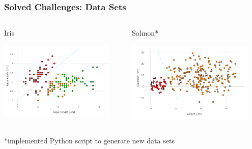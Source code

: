 \documentclass[english,hangout]{beamer}
\begin{document}
\begin{frame}
	\frametitle{Solved Challenges: Data Sets}

  \begin{columns}
    \begin{column}{0.5\textwidth}
      \begin{center}
        Iris

        \includegraphics[width=0.9\textwidth]{Iris}
      \end{center}
    \end{column}
    \begin{column}{0.5\textwidth}
      \begin{center}
        Salmon*

        \includegraphics[width=0.9\textwidth]{Salmon}
      \end{center}
    \end{column}
  \end{columns}

 \vspace{\baselineskip} 

  \begin{center}
    *implemented Python script to generate new data sets
  \end{center}

\end{frame}
\end{document}
